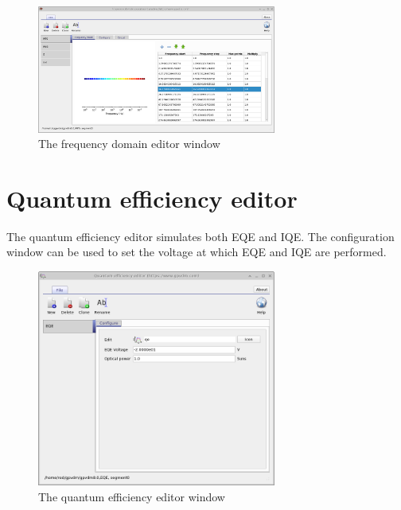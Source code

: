 \begin{figure}[H]
\centering
\includegraphics[width=0.7\textwidth,height=0.5\textwidth]{./images/fx_domain_editor.png}
\caption{The frequency domain editor window}
\label{fig:fxdomaineditor}
\end{figure}

\section{Quantum efficiency editor}
The quantum efficiency editor simulates both EQE and IQE.  The configuration window can be used to set the voltage at which EQE and IQE are performed.
\begin{figure}[H]
\centering
\includegraphics[width=0.7\textwidth,height=0.5\textwidth]{./images/qe_editor.png}
\caption{The quantum efficiency editor window}
\label{fig:qeeditor}
\end{figure}


